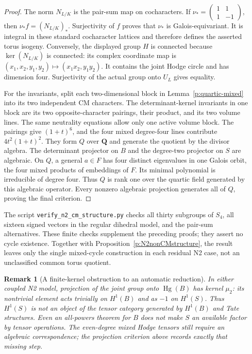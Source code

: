 \documentclass[11pt,reqno]{article}
\theoremstyle{emphasizedplain}
\theoremstyle{emphasizeddefinition}
\theoremstyle{emphasizeddefinition}
\newtheorem{remark}[theorem]{Remark}
\DeclareMathOperator{\Hg}{Hg}
\newcommand{\Q}{\mathbf Q}
\begin{document}
\begin{proof}
The norm $N_{L/K}$ is the pair-sum map on cocharacters. If
$\nu_*=\left(\begin{smallmatrix}1&1\\1&-1\end{smallmatrix}\right)$,
then $\nu_*f=(N_{L/K})_*$. Surjectivity of $f$ proves that
$\nu_*$ is Galois-equivariant. It is integral in these standard
cocharacter lattices and therefore defines the asserted torus
isogeny. Conversely, the displayed group $H$ is connected
because $\ker(N_{L/K})$ is connected: its complex coordinate map
is $(x_1,x_2,y_1,y_2)\mapsto(x_1x_2,y_1y_2)$.
It contains the joint Hodge circle and has dimension four.
Surjectivity of the actual group onto $U_L$ gives equality.

For the invariants, split each two-dimensional block in
Lemma~\ref{p:quartic-mixed} into its two independent CM characters.
The determinant-kernel invariants in one block are its two
opposite-character pairings, their product, and its two volume
lines. The same neutrality equations allow only one active
volume block. The pairings give $(1+t)^6$, and the four mixed
degree-four lines contribute $4t^2(1+t)^2$. They form $Q$ over
$\Q$ and generate the quotient by the divisor algebra.
The determinant projector on $B$ and the degree-two projector
on $S$ are algebraic. On $Q$, a general $a\in F$ has four
distinct eigenvalues in one Galois orbit, the four mixed products
of embeddings of $F$. Its minimal polynomial is irreducible
of degree four. Thus $Q$ is rank one over the quartic field
generated by this algebraic operator. Every nonzero algebraic
projection generates all of $Q$, proving the final criterion.
\end{proof}

The script \texttt{verify\_n2\_cm\_structure.py} checks all thirty
subgroups of $S_4$, all sixteen signed vectors in the regular
dihedral model, and the pair-sum alternatives. These finite
checks supplement the preceding proofs; they assert no cycle
existence. Together with Proposition~\ref{p:N2nonCMstructure},
the result leaves only the single mixed-cycle construction in
each residual N2 case, not an unclassified common torus quotient.

\begin{remark}[A finite-kernel obstruction to an automatic reduction]
In either coupled N2 model, projection of the joint group onto
$\Hg(B)$ has kernel $\mu_2$: its nontrivial element acts trivially
on $H^1(B)$ and as $-1$ on $H^1(S)$. Thus $H^1(S)$ is not an
object of the tensor category generated by $H^1(B)$ and Tate
structures. Even an all-powers theorem for $B$ does not make $S$
an available factor by tensor operations. The even-degree
mixed Hodge tensors still require an algebraic correspondence;
the projection criterion above records exactly that missing step.
\end{remark}
\end{document}
